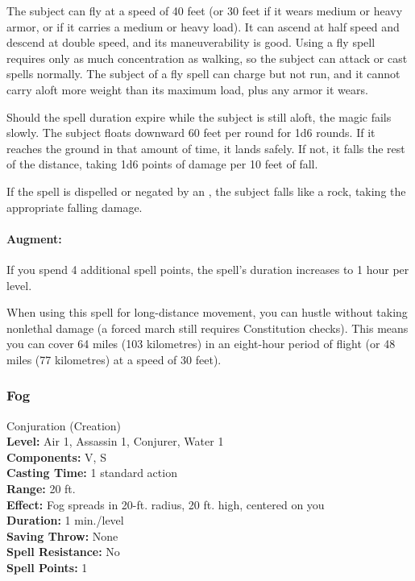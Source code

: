 The subject can fly at a speed of 40 feet (or 30 feet if it wears medium or heavy armor, or if it carries a medium or heavy load). 
It can ascend at half speed and descend at double speed, and its maneuverability is good. 
Using a fly spell requires only as much concentration as walking, so the subject can attack or cast spells normally. 
The subject of a fly spell can charge but not run, and it cannot carry aloft more weight than its maximum load, plus any armor it wears.

Should the spell duration expire while the subject is still aloft, the magic fails slowly. 
The subject floats downward 60 feet per round for 1d6 rounds. 
If it reaches the ground in that amount of time, it lands safely. 
If not, it falls the rest of the distance, taking 1d6 points of damage per 10 feet of fall. 

If the spell is dispelled or negated by an , 
the subject falls like a rock, taking the appropriate falling damage.

\paragraph{Augment:} If you spend 4 additional spell points, the spell's duration increases to 1 hour per level.

When using this spell for long-distance movement, you can hustle without taking nonlethal damage 
(a forced march still requires Constitution checks). 
This means you can cover 64 miles (103 kilometres) in an eight-hour period of flight (or 48 miles (77 kilometres) at a speed of 30 feet).

\subsubsection{Fog}
\label{Spell:Fog}
Conjuration (Creation)
\\ \textbf{Level:} Air 1, Assassin 1, Conjurer, Water 1
\\ \textbf{Components:} V, S
\\ \textbf{Casting Time:} 1 standard action
\\ \textbf{Range:} 20 ft.
\\ \textbf{Effect:} Fog spreads in 20-ft. radius, 20 ft. high, centered on you
\\ \textbf{Duration:} 1 min./level
\\ \textbf{Saving Throw:} None
\\ \textbf{Spell Resistance:} No
\\ \textbf{Spell Points:} 1

